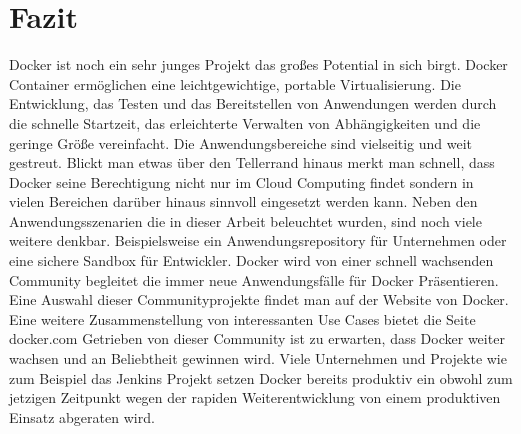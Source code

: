 \chapter{Fazit}
\label{sec:fazit}
Docker ist noch ein sehr junges Projekt das großes Potential in sich birgt. 
Docker Container ermöglichen eine leichtgewichtige, portable Virtualisierung. Die Entwicklung, das Testen und das Bereitstellen von Anwendungen werden durch die schnelle Startzeit, das erleichterte Verwalten von Abhängigkeiten und die geringe Größe vereinfacht. Die Anwendungsbereiche sind vielseitig und weit gestreut. Blickt man etwas über den Tellerrand hinaus merkt man schnell, dass Docker seine Berechtigung nicht nur im Cloud Computing findet sondern in vielen Bereichen darüber hinaus sinnvoll eingesetzt werden kann.
Neben den Anwendungsszenarien die in dieser Arbeit beleuchtet wurden, sind noch viele weitere denkbar. Beispielsweise ein Anwendungsrepository für Unternehmen oder eine sichere Sandbox für Entwickler.
Docker wird von einer schnell wachsenden Community begleitet die immer neue Anwendungsfälle für Docker Präsentieren. Eine Auswahl dieser Communityprojekte findet man auf der Website von Docker. \cite{docker_docker_2014} Eine weitere Zusammenstellung von interessanten Use Cases bietet die Seite docker.com \cite{docker_use_????}
Getrieben von dieser Community ist zu erwarten, dass Docker weiter wachsen und an Beliebtheit gewinnen wird.
Viele Unternehmen und Projekte wie zum Beispiel das Jenkins Projekt setzen Docker bereits produktiv ein obwohl zum jetzigen Zeitpunkt wegen der rapiden Weiterentwicklung von einem produktiven Einsatz abgeraten wird.